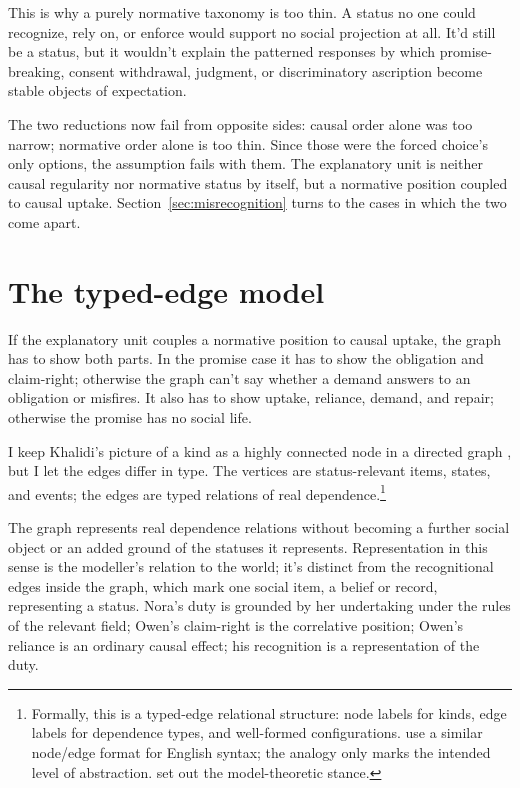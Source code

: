 \documentclass[12pt]{article}
\begin{document}
This is why a purely normative taxonomy is too thin. A status no one could recognize, rely on, or enforce would support no social projection at all. It'd still be a status, but it wouldn't explain the patterned responses by which promise-breaking, consent withdrawal, judgment, or discriminatory ascription become stable objects of expectation.

The two reductions now fail from opposite sides: causal order alone was too narrow; normative order alone is too thin. Since those were the forced choice's only options, the assumption fails with them. The explanatory unit is neither causal regularity nor normative status by itself, but a normative position coupled to causal uptake. Section~\ref{sec:misrecognition} turns to the cases in which the two come apart.

\section{The typed-edge model}
\label{sec:typed-edge}

If the explanatory unit couples a normative position to causal uptake, the graph has to show both parts. In the promise case it has to show the obligation and claim-right; otherwise the graph can't say whether a demand answers to an obligation or misfires. It also has to show uptake, reliance, demand, and repair; otherwise the promise has no social life.

I keep Khalidi's picture of a kind as a highly connected node in a directed graph \citep{khalidi2018nodes}, but I let the edges differ in type. The vertices are status-relevant items, states, and events; the edges are typed relations of real dependence.\footnote{Formally, this is a typed-edge relational structure: node labels for kinds, edge labels for dependence types, and well-formed configurations. \textcite{pullumRogers2008Expressive} use a similar node/edge format for English syntax; the analogy only marks the intended level of abstraction. \textcite{pullum2001} set out the model-theoretic stance.}

The graph represents real dependence relations without becoming a further social object or an added ground of the statuses it represents. Representation in this sense is the modeller's relation to the world; it's distinct from the recognitional edges inside the graph, which mark one social item, a belief or record, representing a status. Nora's duty is grounded by her undertaking under the rules of the relevant field; Owen's claim-right is the correlative position; Owen's reliance is an ordinary causal effect; his recognition is a representation of the duty.
\end{document}
